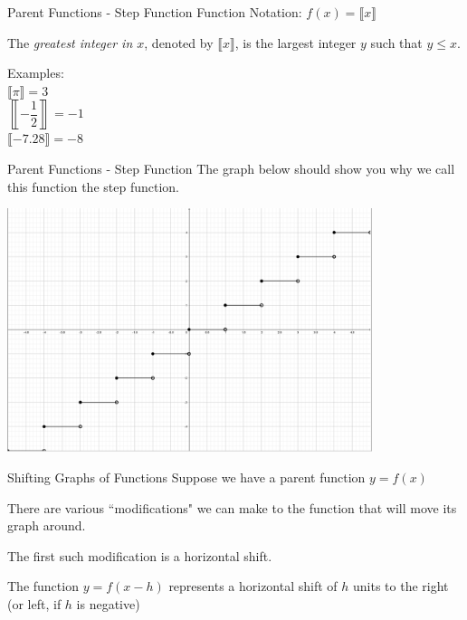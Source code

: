 \documentclass{beamer}
\begin{document}
\begin{frame}[t]{Parent Functions - Step Function}
Function Notation: $f(x) = \llbracket x \rrbracket$

\pause

The \textit{greatest integer in $x$}, denoted by $\llbracket x \rrbracket$, is the largest integer $y$ such that $y \leq x$.

\pause

Examples: \\
$\llbracket \pi \rrbracket = 3$ \\
$\left\llbracket -\dfrac12 \right\rrbracket = -1$ \\
$\llbracket -7.28 \rrbracket = -8$

\end{frame}

\begin{frame}[t]{Parent Functions - Step Function}
The graph below should show you why we call this function the step function.

\includegraphics[width=0.8\textwidth]{Step.png}
\end{frame}

\begin{frame}[t]{Shifting Graphs of Functions}
Suppose we have a parent function $y = f(x)$

There are various ``modifications" we can make to the function that will move its graph around. \vspace{18pt}

\pause

The first such modification is a horizontal shift. 

The function $y = f(x-h)$ represents a horizontal shift of $h$ units to the right (or left, if $h$ is negative)
\end{frame}
\end{document}
